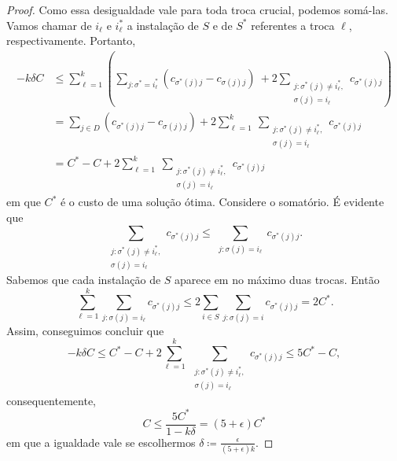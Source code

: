\begin{proof}
Como essa desigualdade vale para toda troca crucial, podemos somá-las. Vamos chamar de $i_\ell$ e $i_\ell^*$ a instalação de $S$ e de $S^*$ referentes a troca $\ell$, respectivamente. Portanto,
\begin{subequations}
\begin{align*}
- k \delta C &\leq \sum_{\ell = 1}^k \left(  \sum_{j : \sigma^* = i_\ell^*} (c_{\sigma^*(j)j} - c_{\sigma(j)j}) \ + 2 \sum_{\substack{ j : \sigma^*(j)\neq i_\ell^*,\\  \sigma(j) = i_\ell}} c_{\sigma^*(j)j}     \right) \\
&= \sum_{j\in D} (c_{\sigma^*(j)j} - c_{\sigma(j)j}) + 2 \sum_{\ell = 1}^k \ \sum_{\substack{ j : \sigma^*(j)\neq i_\ell^*,\\  \sigma(j) = i_\ell}} c_{\sigma^*(j)j} \\
&= C^* - C + 2 \sum_{\ell = 1}^k \ \sum_{\substack{ j : \sigma^*(j)\neq i_\ell^*,\\  \sigma(j) = i_\ell}} c_{\sigma^*(j)j}
\end{align*}
\end{subequations}
em que $C^*$ é o custo de uma solução ótima. Considere o somatório. É evidente que 
\[\sum_{\substack{ j : \sigma^*(j)\neq i_\ell^*,\\  \sigma(j) = i_\ell}} c_{\sigma^*(j)j} \leq \sum_{\substack{j:\sigma(j) = i_\ell}} c_{\sigma^*(j)j}.\]
Sabemos que cada instalação de $S$ aparece em no máximo duas trocas. Então
\[ \sum_{\ell=1}^k \sum_{j: \sigma(j) = i_\ell} c_{\sigma^*(j)j} \leq 2\sum_{i \in S} \sum_{j: \sigma(j) = i} c_{\sigma^*(j)j} = 2 C^*.\]
Assim, conseguimos concluir que 
\[ - k \delta C \leq C^* - C + 2 \sum_{\ell = 1}^k \ \sum_{\substack{ j : \sigma^*(j)\neq i_\ell^*,\\  \sigma(j) = i_\ell}} c_{\sigma^*(j)j} \leq 5C^* - C,\]
consequentemente, 
\[C \leq \frac{5C^*}{1 - k\delta} = (5+\epsilon)C^*\]
em que a igualdade vale se escolhermos $\delta \coloneqq \frac{\epsilon}{(5+\epsilon)k}$.
\end{proof}